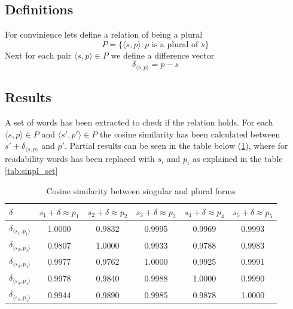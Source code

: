 \documentclass{article}
\begin{document}
  \subsection{Definitions}
  For convinience lets define a relation of being a plural
  \begin{equation}
    P = \{\langle s, p \rangle : \textrm{$p$ is a plural of $s$} \}
  \end{equation}
  Next for each pair $\langle s, p \rangle \in P$  we define a difference vector
  \begin{equation}
    \delta_{\langle s, p \rangle} = p - s
  \end{equation}

  \subsection{Results}
  A set of words has been extracted to check if the relation holds. For each
  $\langle s, p \rangle \in P$ and $\langle s', p' \rangle \in P$ the cosine
  similarity has been calculated between $s' + \delta_{\langle s, p \rangle}$
  and $p'$. Partial results can be seen in the table below (\ref{tab:sinpl_sim}),
  where for readability words has been replaced with $s_i$ and $p_i$ as explained
  in the table \ref{tab:sinpl_set}

  \begin{table}[ht]
    \center
  \begin{tabular}{|l|c|c|c|c|c|}
  \hline
    $\delta$ & $s_1 + \delta \approx p_1$ & $s_2 + \delta \approx p_2$ & $s_3 + \delta \approx p_3$  & $s_4 + \delta \approx p_4$  & $s_5 + \delta \approx p_5$ \\ \hline
    $\delta_{\langle s_1, p_1 \rangle}$ & 1.0000 & 0.9832 & 0.9995 & 0.9969 & 0.9993 \\ \hline
    $\delta_{\langle s_2, p_2 \rangle}$ & 0.9807 & 1.0000 & 0.9933 & 0.9788 & 0.9983 \\ \hline
    $\delta_{\langle s_3, p_3 \rangle}$ & 0.9977 & 0.9762 & 1.0000 & 0.9925 & 0.9991 \\ \hline
    $\delta_{\langle s_4, p_4 \rangle}$ & 0.9978 & 0.9840 & 0.9988 & 1.0000 & 0.9990 \\ \hline
    $\delta_{\langle s_5, p_5 \rangle}$ & 0.9944 & 0.9890 & 0.9985 & 0.9878 & 1.0000 \\ \hline
  \end{tabular}
  \caption{Cosine similarity between singular and plural forms}
  \label{tab:sinpl_sim}
  \end{table}
\end{document}
